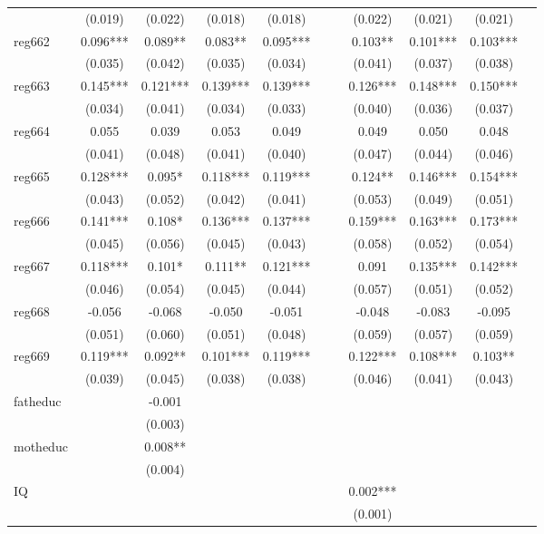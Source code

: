 \begin{table}[htbp]
\begin{tabular}{lcccccccccc}
 & (0.019) & (0.022) & (0.018) & (0.018) &  &  & (0.022) & (0.021) & (0.021) &  \\
reg662 & 0.096*** & 0.089** & 0.083** & 0.095*** &  &  & 0.103** & 0.101*** & 0.103*** &  \\
 & (0.035) & (0.042) & (0.035) & (0.034) &  &  & (0.041) & (0.037) & (0.038) &  \\
reg663 & 0.145*** & 0.121*** & 0.139*** & 0.139*** &  &  & 0.126*** & 0.148*** & 0.150*** &  \\
 & (0.034) & (0.041) & (0.034) & (0.033) &  &  & (0.040) & (0.036) & (0.037) &  \\
reg664 & 0.055 & 0.039 & 0.053 & 0.049 &  &  & 0.049 & 0.050 & 0.048 &  \\
 & (0.041) & (0.048) & (0.041) & (0.040) &  &  & (0.047) & (0.044) & (0.046) &  \\
reg665 & 0.128*** & 0.095* & 0.118*** & 0.119*** &  &  & 0.124** & 0.146*** & 0.154*** &  \\
 & (0.043) & (0.052) & (0.042) & (0.041) &  &  & (0.053) & (0.049) & (0.051) &  \\
reg666 & 0.141*** & 0.108* & 0.136*** & 0.137*** &  &  & 0.159*** & 0.163*** & 0.173*** &  \\
 & (0.045) & (0.056) & (0.045) & (0.043) &  &  & (0.058) & (0.052) & (0.054) &  \\
reg667 & 0.118*** & 0.101* & 0.111** & 0.121*** &  &  & 0.091 & 0.135*** & 0.142*** &  \\
 & (0.046) & (0.054) & (0.045) & (0.044) &  &  & (0.057) & (0.051) & (0.052) &  \\
reg668 & -0.056 & -0.068 & -0.050 & -0.051 &  &  & -0.048 & -0.083 & -0.095 &  \\
 & (0.051) & (0.060) & (0.051) & (0.048) &  &  & (0.059) & (0.057) & (0.059) &  \\
reg669 & 0.119*** & 0.092** & 0.101*** & 0.119*** &  &  & 0.122*** & 0.108*** & 0.103** &  \\
 & (0.039) & (0.045) & (0.038) & (0.038) &  &  & (0.046) & (0.041) & (0.043) &  \\
fatheduc &  & -0.001 &  &  &  &  &  &  &  &  \\
 &  & (0.003) &  &  &  &  &  &  &  &  \\
motheduc &  & 0.008** &  &  &  &  &  &  &  &  \\
 &  & (0.004) &  &  &  &  &  &  &  &  \\
IQ &  &  &  &  &  &  & 0.002*** &  &  &  \\
 &  &  &  &  &  &  & (0.001) &  &  &  \\

\end{tabular}
\end{table}
